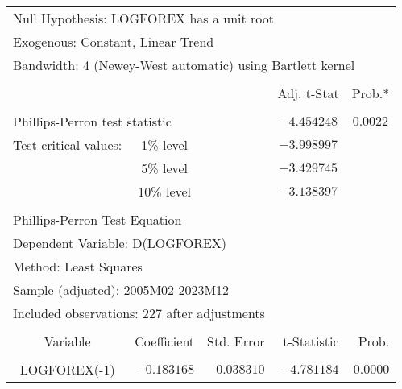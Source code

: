 \begin{tabular}{lrrrr}
\multicolumn{4}{l}{Null Hypothesis: LOGFOREX has a unit root}&\multicolumn{1}{c}{}\\
\multicolumn{3}{l}{Exogenous: Constant, Linear Trend}&\multicolumn{1}{c}{}&\multicolumn{1}{c}{}\\
\multicolumn{5}{l}{Bandwidth: 4 (Newey-West automatic) using Bartlett kernel}\\
[4.5pt] \hline \\ [-4.5pt]
\multicolumn{1}{c}{}&\multicolumn{1}{c}{}&\multicolumn{1}{c}{}&\multicolumn{1}{c}{Adj. t-Stat}&\multicolumn{1}{c}{Prob.*}\\
[4.5pt] \hline \\ [-4.5pt]
\multicolumn{2}{l}{Phillips-Perron test statistic}&\multicolumn{1}{l}{}&\multicolumn{1}{c}{$-4.454248$}&\multicolumn{1}{c}{$0.0022$}\\
\multicolumn{1}{l}{Test critical values:}&\multicolumn{1}{c}{1\% level}&\multicolumn{1}{c}{}&\multicolumn{1}{c}{$-3.998997$}&\multicolumn{1}{c}{}\\
\multicolumn{1}{c}{}&\multicolumn{1}{c}{5\% level}&\multicolumn{1}{c}{}&\multicolumn{1}{c}{$-3.429745$}&\multicolumn{1}{c}{}\\
\multicolumn{1}{c}{}&\multicolumn{1}{c}{10\% level}&\multicolumn{1}{c}{}&\multicolumn{1}{c}{$-3.138397$}&\multicolumn{1}{c}{}\\
[4.5pt] \hline \\ [-4.5pt]
\multicolumn{2}{l}{Phillips-Perron Test Equation}&\multicolumn{1}{c}{}&\multicolumn{1}{c}{}&\multicolumn{1}{c}{}\\
\multicolumn{3}{l}{Dependent Variable: D(LOGFOREX)}&\multicolumn{1}{c}{}&\multicolumn{1}{c}{}\\
\multicolumn{2}{l}{Method: Least Squares}&\multicolumn{1}{c}{}&\multicolumn{1}{c}{}&\multicolumn{1}{c}{}\\
\multicolumn{3}{l}{Sample (adjusted): 2005M02 2023M12}&\multicolumn{1}{c}{}&\multicolumn{1}{c}{}\\
\multicolumn{4}{l}{Included observations: 227 after adjustments}&\multicolumn{1}{c}{}\\
[4.5pt] \hline \\ [-4.5pt]
\multicolumn{1}{c}{Variable}&\multicolumn{1}{r}{Coefficient}&\multicolumn{1}{r}{Std. Error}&\multicolumn{1}{r}{t-Statistic}&\multicolumn{1}{r}{Prob.}\\
[4.5pt] \hline \\ [-4.5pt]
\multicolumn{1}{c}{LOGFOREX(-1)}&\multicolumn{1}{r}{$-0.183168$}&\multicolumn{1}{r}{$0.038310$}&\multicolumn{1}{r}{$-4.781184$}&\multicolumn{1}{r}{$0.0000$}\\

\end{tabular}
